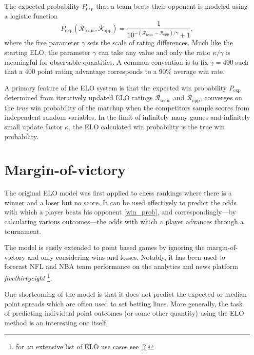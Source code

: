 \documentclass[aps,prc,reprint,amsmath,superscriptaddress]{revtex4-1}
\begin{document}
The expected probability $P_\text{exp}$ that a team beats their opponent is modeled using a logistic function
\begin{equation}
  \label{win_prob}
  P_\text{exp}(\mathcal{R}_\text{team}, \mathcal{R}_\text{opp}) = \frac{1}{10^{-(\mathcal{R}_\text{team} - \mathcal{R}_\text{opp})/\gamma} +1},
\end{equation}
where the free parameter $\gamma$ sets the scale of rating differences.
Much like the starting ELO, the parameter $\gamma$ can take any value and only the ratio $\kappa/\gamma$ is meaningful for observable quantities.
A common convention is to fix $\gamma=400$ such that a 400 point rating advantage corresponds to a 90\% average win rate.

A primary feature of the ELO system is that the expected win probability $P_\text{exp}$ determined from iteratively updated ELO ratings $\mathcal{R}_\text{team}$ and $\mathcal{R}_\text{opp}$, converges on the \emph{true} win probability of the matchup when the competitors sample scores from independent random variables.
In the limit of infinitely many games and infinitely small update factor $\kappa$, the ELO calculated win probability is the true win probability.

\section{Margin-of-victory}

The original ELO model was first applied to chess rankings where there is a winner and a loser but no score.
It can be used effectively to predict the odds with which a player beats his opponent \eqref{win_prob}, and correspondingly---by calculating various outcomes---the odds with which a player advances through a tournament. 

The model is easily extended to point based games by ignoring the margin-of-victory and only considering wins and losses.
Notably, it has been used to forecast NFL and NBA team performance on the analytics and news platform \emph{fivethirtyeight} \footnote{for an extensive list of ELO use cases see \ref{?}}.

One shortcoming of the model is that it does not predict the expected or median point spreads which are often used to set betting lines.
More generally, the task of predicting individual point outcomes (or some other quantity) using the ELO method is an interesting one itself.
\end{document}
